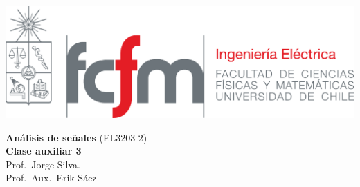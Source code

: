 \documentclass[
  11pt,
  letterpaper,
   addpoints,
   answers
  ]{exam}
\begin{document}
\noindent
\begin{minipage}{0.47\textwidth}
\includegraphics[width=\textwidth]{../fcfm_die}
\end{minipage}
\begin{minipage}{0.53\textwidth}
\begin{center} 
\large\textbf{Análisis de señales} (EL3203-2) \\
\large\textbf{Clase auxiliar 3} \\
\normalsize Prof.~Jorge Silva.\\
\normalsize Prof.~Aux.~Erik Sáez
\end{center}
\end{minipage}

\vspace{0.5cm}
\noindent
\vspace{.85cm}
\end{document}
